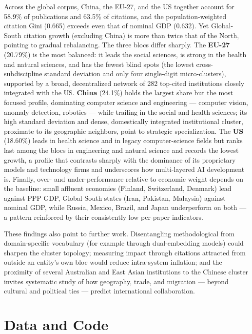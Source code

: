 \documentclass{article}
\begin{document}
	Across the global corpus, China, the EU-27, and the US together account for 58.9\% of publications and 63.5\% of citations, and the population-weighted citation Gini (0.665) exceeds even that of nominal GDP (0.632). Yet Global-South citation growth (excluding China) is more than twice that of the North, pointing to gradual rebalancing. The three blocs differ sharply. The \textbf{EU-27} (20.79\%) is the most balanced: it leads the social sciences, is strong in the health and natural sciences, and has the fewest blind spots (the lowest cross-subdiscipline standard deviation and only four single-digit micro-clusters), supported by a broad, decentralized network of 282 top-cited institutions closely integrated with the US. \textbf{China} (24.1\%) holds the largest share but the most focused profile, dominating computer science and engineering --- computer vision, anomaly detection, robotics --- while trailing in the social and health sciences; its high standard deviation and dense, domestically integrated institutional cluster, proximate to its geographic neighbors, point to strategic specialization. The \textbf{US} (18.60\%) leads in health science and in legacy computer-science fields but ranks last among the blocs in engineering and natural science and records the lowest growth, a profile that contrasts sharply with the dominance of its proprietary models and technology firms and underscores how multi-layered AI development is. Finally, over- and under-performance relative to economic weight depends on the baseline: small affluent economies (Finland, Switzerland, Denmark) lead against PPP-GDP, Global-South states (Iran, Pakistan, Malaysia) against nominal GDP, while Russia, Mexico, Brazil, and Japan underperform on both --- a pattern reinforced by their consistently low per-paper indicators.
	
	These findings also point to further work. Disentangling methodological from domain-specific vocabulary (for example through dual-embedding models) could sharpen the cluster topology; measuring impact through citations attracted from outside an entity's own bloc would reduce intra-system inflation; and the proximity of several Australian and East Asian institutions to the Chinese cluster invites systematic study of how geography, trade, and migration --- beyond cultural and political ties --- predict international collaboration.
	
	\section*{Data and Code}
	
\end{document}
